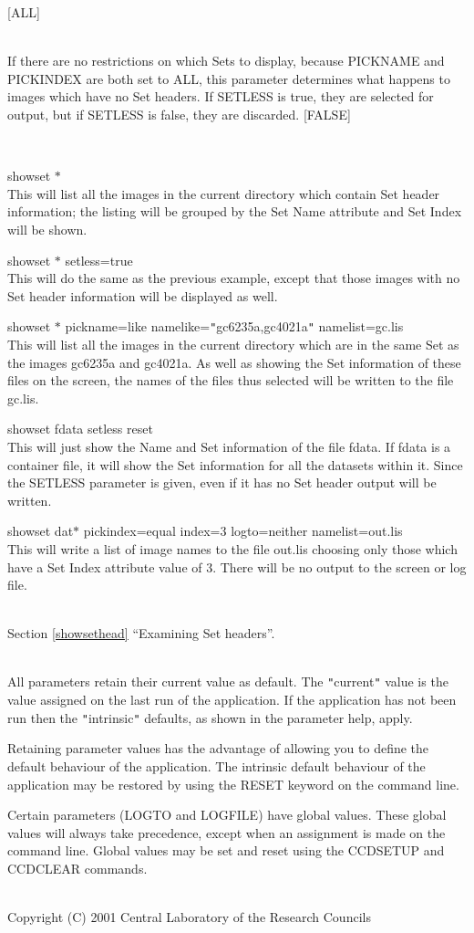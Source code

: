 \documentclass[twoside,11pt]{article}
\newcommand{\htmlref}[2]{#1}
\newcommand{\latexhtml}[2]{#1}
\renewcommand{\_}{\texttt{\symbol{95}}}
\newcommand{\xroutine}[1]{\htmlref{{\sc #1}}{#1}}
\newcommand{\secref}[2]{\latexhtml{Section \ref{#1} ``#2''}{``\htmlref{#2}{#1}''}}
\newcommand{\sstexamples}[1]{
   \item[Examples:] \mbox{} \\
   \vspace{-3.5ex}
   \begin{description}
      #1
   \end{description}
}
\newcommand{\sstsubsection}[1]{ \item[{#1}] \mbox{} \\}
\newcommand{\sstexamplesubsection}[2]{\sloppy \item{\ssttt #1} \mbox{} \\ #2 }
\newcommand{\sstdiytopic}[2]{\item[#1:] \mbox{} \\[1.3ex] #2}
\newcommand{\sstexamples}[1]{
      \item[Examples:] \\
      \begin{description}
         #1
      \end{description}
      \\
   }
\newcommand{\sstsubsection}[1]{\item[{#1}]}
\newcommand{\sstexamplesubsection}[2]{\item[{\ssttt #1}] #2}
\newcommand{\sstdiytopic}[2]{\item[{#1:}] #2 }
\begin{document}
{{{{         }
         [ALL]
      }
      \sstsubsection{
         SETLESS = \_LOGICAL (Read)
      }{
         If there are no restrictions on which Sets to display, because
         PICKNAME and PICKINDEX are both set to ALL, this parameter
         determines what happens to images which have no Set headers.
         If SETLESS is true, they are selected for output, but if
         SETLESS is false, they are discarded.
         [FALSE]
      }
   }
   \sstexamples{
      \sstexamplesubsection{
         showset $*$
      }{
         This will list all the images in the current directory which
         contain Set header information; the listing will be grouped
         by the Set Name attribute and Set Index will be shown.
      }
      \sstexamplesubsection{
         showset $*$ setless=true
      }{
         This will do the same as the previous example, except that
         those images with no Set header information will be displayed
         as well.
      }
      \sstexamplesubsection{
         showset $*$ pickname=like namelike={\tt "}gc6235a,gc4021a{\tt "} namelist=gc.lis
      }{
         This will list all the images in the current directory which
         are in the same Set as the images gc6235a and gc4021a.
         As well as showing the Set information of these files on
         the screen, the names of the files thus selected will be
         written to the file gc.lis.
      }
      \sstexamplesubsection{
         showset fdata setless reset
      }{
         This will just show the Name and Set information of the file
         fdata.  If fdata is a container file, it will show the
         Set information for all the datasets within it.  Since the
         SETLESS parameter is given, even if it has no Set header
         output will be written.
      }
      \sstexamplesubsection{
         showset dat$*$ pickindex=equal index=3 logto=neither namelist=out.lis
      }{
         This will write a list of image names to the file out.lis
         choosing only those which have a Set Index attribute value
         of 3.  There will be no output to the screen or log file.
      }
   }
   \sstdiytopic{
      See also
   } {
      \secref{showsethead}{Examining Set headers}.
   }
   \sstdiytopic{
      Behaviour of Parameters
   }{
      All parameters retain their current value as default. The
      {\tt "}current{\tt "} value is the value assigned on the last run of the
      application. If the application has not been run then the
      {\tt "}intrinsic{\tt "} defaults, as shown in the parameter help, apply.

      Retaining parameter values has the advantage of allowing you to
      define the default behaviour of the application. The intrinsic
      default behaviour of the application may be restored by using the
      RESET keyword on the command line.

      Certain parameters (LOGTO and LOGFILE) have global
      values. These global values will always take precedence, except
      when an assignment is made on the command line. Global values may
      be set and reset using the \xroutine{CCDSETUP} and \xroutine{CCDCLEAR} commands.
   }
   \sstdiytopic{
      Copyright
   }{
      Copyright (C) 2001 Central Laboratory of the Research Councils
   }
}
\end{document}
